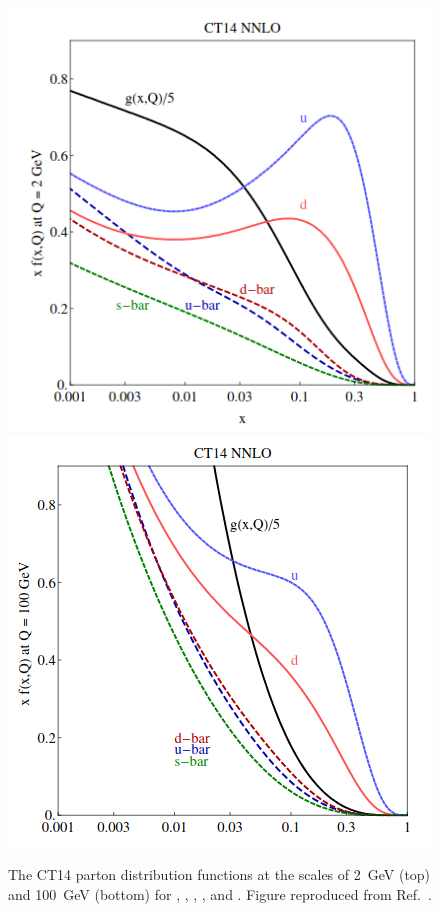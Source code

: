 \begin{figure}[htbp]
	\centering
    \includegraphics[width=.75\textwidth]{figures/protoncollisions/pdf_ct14_q2.png} \\
    \includegraphics[width=.75\textwidth]{figures/protoncollisions/pdf_ct14_q100.png}
    \caption{The CT14 parton distribution functions at the scales of \SI{2}{\giga\electronvolt} (top) and \SI{100}{\giga\electronvolt} (bottom) for \Pqu \Paqu, \Pqd, \Paqd, \Paqs, and \Pgluon. Figure reproduced from Ref.~\cite{Dulat2016}.}
    \label{fig:pp:pdfs:ct14}
\end{figure}

